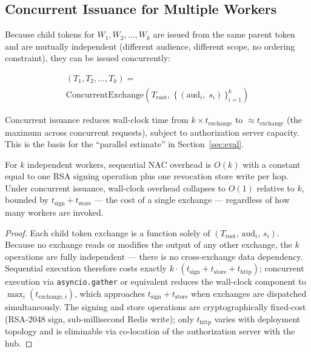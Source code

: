 \documentclass[journal]{IEEEtran}
\begin{document}
\subsection{Concurrent Issuance for Multiple Workers}

Because child tokens for $W_1, W_2, \ldots, W_k$ are issued from the same parent
token and are mutually independent (different audience, different scope, no
ordering constraint), they can be issued concurrently:

\begin{multline}
(T_1, T_2, \ldots, T_k) = \\
\mathrm{ConcurrentExchange}\!\left(
  T_{\mathrm{root}},\;
  \bigl\{\,(\mathrm{aud}_i,\; s_i)\,\bigr\}_{i=1}^{k}
\right)
\label{eq:concurrent}
\end{multline}

Concurrent issuance reduces wall-clock time from $k \times t_{\mathrm{exchange}}$
to $\approx t_{\mathrm{exchange}}$ (the maximum across concurrent requests),
subject to authorization server capacity. This is the basis for the
``parallel estimate'' in Section~\ref{sec:eval}.

\begin{proposition}
\label{prop:overhead}
For $k$ independent workers, sequential NAC overhead is $O(k)$ with a
constant equal to one RSA signing operation plus one revocation store write
per hop. Under concurrent issuance, wall-clock overhead collapses to $O(1)$
relative to $k$, bounded by $t_{\mathrm{sign}} + t_{\mathrm{store}}$ --- the
cost of a single exchange --- regardless of how many workers are invoked.
\end{proposition}
\begin{proof}
Each child token exchange is a function solely of
$(T_{\mathrm{root}},\, \mathrm{aud}_i,\, s_i)$. Because no exchange reads or
modifies the output of any other exchange, the $k$ operations are fully
independent --- there is no cross-exchange data dependency. Sequential
execution therefore costs exactly $k \cdot (t_{\mathrm{sign}} +
t_{\mathrm{store}} + t_{\mathrm{http}})$; concurrent execution via
\texttt{asyncio.gather} or equivalent reduces the wall-clock component to
$\max_i(t_{\mathrm{exchange},i})$, which approaches $t_{\mathrm{sign}} +
t_{\mathrm{store}}$ when exchanges are dispatched simultaneously. The signing
and store operations are cryptographically fixed-cost (RSA-2048 sign,
sub-millisecond Redis write); only $t_{\mathrm{http}}$ varies with deployment
topology and is eliminable via co-location of the authorization server with
the hub.
\end{proof}
\end{document}
